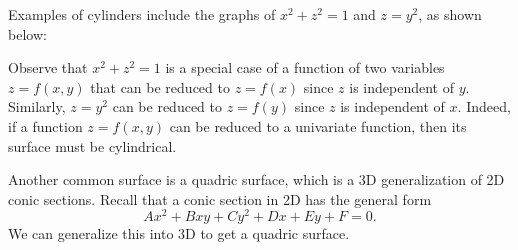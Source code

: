 Examples of cylinders include the graphs of $x^2 + z^2 = 1$ and $z = y^2$, as shown below:

\begin{figure}[H]
    \centering
    \begin{minipage}[t]{.5\textwidth}
      \centering
    \end{minipage}%
    \begin{minipage}[t]{.5\textwidth}
      \centering
    \end{minipage}
\end{figure}

Observe that $x^2 + z^2 = 1$ is a special case of a function of two variables $z = f(x, y)$ that can be reduced to $z = f(x)$ since $z$ is independent of $y$. Similarly, $z = y^2$ can be reduced to $z = f(y)$ since $z$ is independent of $x$. Indeed, if a function $z = f(x, y)$ can be reduced to a univariate function, then its surface must be cylindrical.

Another common surface is a quadric surface, which is a 3D generalization of 2D conic sections. Recall that a conic section in 2D has the general form \[Ax^2 + Bxy + Cy^2 + Dx + Ey + F = 0.\] We can generalize this into 3D to get a quadric surface.

